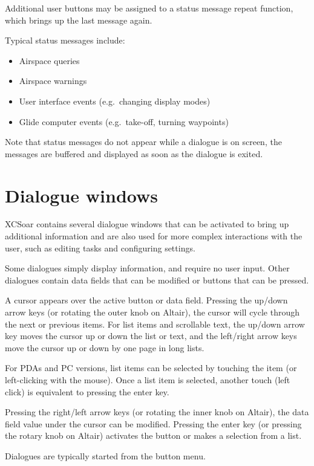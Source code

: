Additional user buttons may be assigned to a status message repeat function,
which brings up the last message again.

Typical status messages include:
\begin{itemize}
\item Airspace queries
\item Airspace warnings
\item User interface events (e.g.\ changing display modes)
\item Glide computer events (e.g.\ take-off, turning waypoints)
\end{itemize}

Note that status messages do not appear while a dialogue is on screen, the
messages are buffered and displayed as soon as the dialogue is exited.


\section{Dialogue windows}\label{sec:dialog-windows}

XCSoar contains several dialogue windows that can be activated to bring up
additional information and are also used for more complex interactions with the
user, such as editing tasks and configuring settings.

Some dialogues simply display information, and require no user input. Other
dialogues contain data fields that can be modified or buttons that can be pressed.  

A cursor appears over the active button or data field. Pressing the up/down
arrow keys (or rotating the outer knob on Altair), the cursor will cycle
through the next or previous items. For list items and scrollable text, the
up/down arrow key moves the cursor up or down the list or text, and the
left/right arrow keys move the cursor up or down by one page in long lists.

For PDAs and PC versions, list items can be selected by touching the item (or
left-clicking with the mouse). Once a list item is selected, another touch
(left click) is equivalent to pressing the enter key.

Pressing the right/left arrow keys (or rotating the inner knob on Altair), the
data field value under the cursor can be modified. Pressing the enter key (or
pressing the rotary knob on Altair) activates the button or makes a selection
from a list.

Dialogues are typically started from the button menu.  

